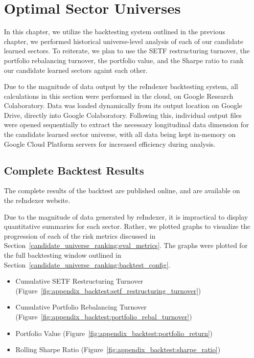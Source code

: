 \documentclass[../main.tex]{subfiles}
\begin{document}
    
\chapter{Optimal Sector Universes}


In this chapter, we utilize the backtesting system outlined in the previous chapter, we performed historical universe-level analysis of each of our candidate learned sectors. To reiterate, we plan to use the SETF restructuring turnover, the portfolio rebalancing turnover, the portfolio value, and the Sharpe ratio to rank our candidate learned sectors againt each other.

Due to the magnitude of data output by the reIndexer backtesting system, all calculations in this section were performed in the cloud, on Google Research Colaboratory. Data was loaded dynamically from its output location on Google Drive, directly into Google Colaboratory. Following this, individual output files were opened sequentially to extract the necessary longitudinal data dimension for the candidate learned sector universe, with all data being kept in-memory on Google Cloud Platform servers for increased efficiency during analysis.

\section{Complete Backtest Results}

The complete results of the backtest are published online, and are available on the reIndexer website.

Due to the magnitude of data generated by reIndexer, it is impractical to display quantitative summaries for each sector. Rather, we plotted graphs to visualize the progression of each of the risk metrics discussed in Section~\ref{candidate_universe_ranking:eval_metrics}. The graphs were plotted for the full backtesting window outlined in Section~\ref{candidate_universe_ranking:backtest_config}.

\begin{itemize}
    \item Cumulative SETF Restructuring Turnover (Figure~\ref{fig:appendix_backtest:setf_restructuring_turnover})
    \item Cumulative Portfolio Rebalancing Turnover (Figure~\ref{fig:appendix_backtest:portfolio_rebal_turnover})
    \item Portfolio Value (Figure~\ref{fig:appendix_backtest:portfolio_return})
    \item Rolling Sharpe Ratio (Figure~\ref{fig:appendix_backtest:sharpe_ratio})
\end{itemize}
\end{document}
